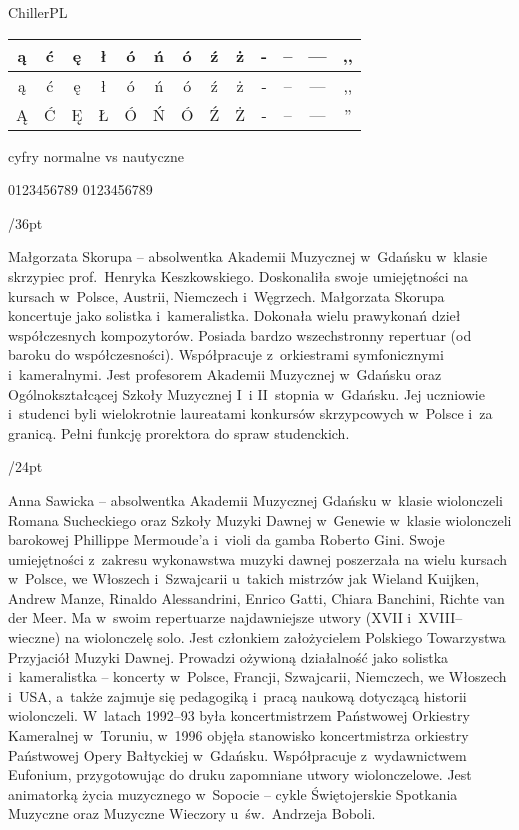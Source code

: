 \documentclass[twoside,a4page]{article}
\newcommand{\opis}[1]{{\fontsize{10pt}{12pt}\sffamily\selectfont  #1} }
\newcommand{\Opis}[1]{\vskip12pt plus 24pt\opis{#1}\par}
\begin{document}
\Opis{ChillerPL}

\fontsize{30pt}{36pt}\selectfont

\begin{tabular}{|c|c|c|c|c|c|c|c|c|c|c|c|c|}\hline
\opis{ą} & \opis{ć} & \opis{ę} & \opis{ł} & \opis{ó} & \opis{ń} & 
  \opis{ó} & \opis{ź} & \opis{ż} & \opis{-} &  \opis{--} &  \opis{---} &  \opis{,,} \\ \hline
ą & ć & ę & ł & ó & ń & ó & ź & ż & - &  -- &  --- &  ,, \\ \hline
Ą & Ć & Ę & Ł & Ó & Ń & Ó & Ź & Ż & - &  -- &  --- &  '' \\ \hline
\end{tabular}

\Opis{cyfry normalne vs nautyczne}

0123456789
0123456789

\Opis{30/36pt}

Małgorzata Skorupa – absolwentka Akademii Muzycznej w~Gdańsku w~klasie
skrzypiec prof.~Henryka Keszkowskiego. Doskonaliła swoje umiejętności
na kursach w~Polsce, Austrii, Niemczech i~Węgrzech. Małgorzata Skorupa
koncertuje jako solistka i~kameralistka. Dokonała wielu prawykonań
dzieł współczesnych kompozytorów. Posiada bardzo wszechstronny
repertuar (od baroku do współczesności). Współpracuje z~orkiestrami
symfonicznymi i~kameralnymi. Jest profesorem Akademii Muzycznej
w~Gdańsku oraz Ogólnokształcącej Szkoły Muzycznej I~i II~stopnia
w~Gdańsku. Jej uczniowie i~studenci byli wielokrotnie laureatami
konkursów skrzypcowych w~Polsce i~za granicą. Pełni funkcję prorektora
do spraw studenckich.

\Opis{18/24pt}
\fontsize{24pt}{28pt}\selectfont

Anna Sawicka – absolwentka Akademii Muzycznej Gdańsku w~klasie
wiolonczeli Romana Sucheckiego oraz Szkoły Muzyki Dawnej w~Genewie
w~klasie wiolonczeli barokowej Phillippe Mermoude'a i~violi da gamba
Roberto Gini. Swoje umiejętności z~zakresu wykonawstwa muzyki dawnej
poszerzała na wielu kursach w~Polsce, we Włoszech i~Szwajcarii
u~takich mistrzów jak Wieland Kuijken, Andrew Manze, Rinaldo
Alessandrini, Enrico Gatti, Chiara Banchini, Richte van der Meer.
Ma w~swoim repertuarze najdawniejsze utwory (XVII i~XVIII–wieczne) na
wiolonczelę solo. Jest członkiem założycielem Polskiego Towarzystwa
Przyjaciół Muzyki Dawnej. Prowadzi ożywioną działalność jako solistka
i~kameralistka – koncerty w~Polsce, Francji, Szwajcarii, Niemczech, we
Włoszech i~USA, a~także zajmuje się pedagogiką i~pracą naukową
dotyczącą historii wiolonczeli. W~latach 1992–93 była
koncertmistrzem Państwowej Orkiestry Kameralnej w~Toruniu, w~1996
objęła stanowisko koncertmistrza orkiestry Państwowej Opery Bałtyckiej
w~Gdańsku. Współpracuje z~wydawnictwem Eufonium, przygotowując do
druku zapomniane utwory wiolonczelowe. Jest animatorką życia
muzycznego w~Sopocie – cykle Świętojerskie Spotkania Muzyczne
oraz Muzyczne Wieczory u~św.~Andrzeja Boboli.
\end{document}
